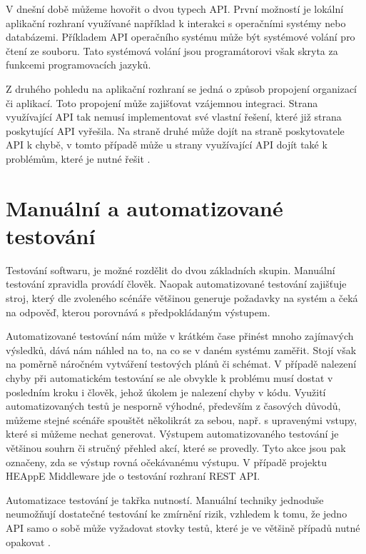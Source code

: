 V dnešní době můžeme hovořit o dvou typech API. První možností je lokální aplikační rozhraní využívané například k interakci s operačními systémy nebo databázemi. Příkladem API operačního systému může být systémové volání pro čtení ze souboru. Tato systémová volání jsou programátorovi však skryta za funkcemi programovacích jazyků.

Z druhého pohledu na aplikační rozhraní se jedná o způsob propojení organizací či aplikací. Toto propojení může zajišťovat vzájemnou integraci. Strana využívající API tak nemusí implementovat své vlastní řešení, které již strana poskytující API vyřešila. Na straně druhé může dojít na straně poskytovatele API k chybě, v tomto případě může u strany využívající API dojít také k problémům, které je nutné řešit \cite{Mitchell2015}.


\section{Manuální a automatizované testování}
Testování softwaru, je možné rozdělit do dvou základních skupin. Manuální testování zpravidla provádí člověk. Naopak automatizované testování zajišťuje stroj, který dle zvoleného scénáře většinou generuje požadavky na systém a čeká na odpověď, kterou porovnává s předpokládaným výstupem.

Automatizované testování nám může v krátkém čase přinést mnoho zajímavých výsledků, dává nám náhled na to, na co se v daném systému zaměřit. Stojí však na poměrně náročném vytváření testových plánů či schémat. V případě nalezení chyby při automatickém testování se ale obvykle k problému musí dostat v posledním kroku i člověk, jehož úkolem je nalezení chyby v kódu. Využití automatizovaných testů je nesporně výhodné, především z časových důvodů, můžeme stejné scénáře spouštět několikrát za sebou, např. s upravenými vstupy, které si můžeme nechat generovat. Výstupem automatizovaného testování je většinou souhrn či stručný přehled akcí, které se provedly. Tyto akce jsou pak označeny, zda se výstup rovná očekávanému výstupu. V případě projektu HEAppE Middleware jde o testování rozhraní REST API.

Automatizace testování je takřka nutností. Manuální techniky jednoduše neumožňují dostatečné testování ke zmírnění rizik, vzhledem k tomu, že jedno API samo o sobě může vyžadovat stovky testů, které je ve většině případů nutné opakovat \cite{Mitchell2015}.



